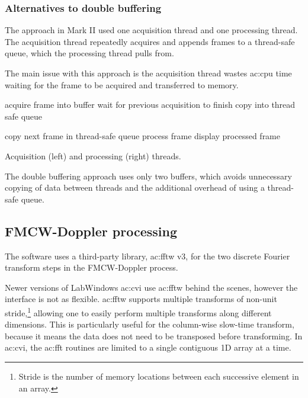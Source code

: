 \documentclass{article}
\begin{document}
\subsubsection{Alternatives to double buffering}\label{sc:AltToDblBuf}
The approach in Mark II used one acquisition thread and one processing thread. The acquisition thread repeatedly acquires and appends frames to a thread-safe queue, which the processing thread pulls from.

The main issue with this approach is the acquisition thread wastes \acrshort{ac:cpu} time waiting for the frame to be acquired and transferred to memory.

\begin{algorithm}
	\begin{minipage}{0.48\linewidth}
		\begin{algorithmic}
			\State acquire frame into buffer
			\State wait for previous acquisition to finish
			\State copy into thread safe queue
			\EndWhile
		\end{algorithmic}
	\end{minipage}
	\begin{minipage}{0.48\linewidth}
		\begin{algorithmic}
			\While {keep acquiring data}
			\State copy next frame in thread-safe queue
			\State process frame
			\State display processed frame
			\EndWhile
		\end{algorithmic}
	\end{minipage}
	\caption{Acquisition (left) and processing (right) threads.}\label{alg:TwoThreads}
\end{algorithm}

The double buffering approach uses only two buffers, which avoids unnecessary copying of data between threads and the additional overhead of using a thread-safe queue.

\subsection{FMCW-Doppler processing}
The software uses a third-party library, \acrshort{ac:fftw} v3\cite{FFTWv3}, for the two discrete Fourier transform steps in the FMCW-Doppler process.

Newer versions of LabWindows \acrshort{ac:cvi} use \acrshort{ac:fftw} behind the scenes, however the interface is not as flexible. \acrshort{ac:fftw} supports multiple transforms of non-unit stride,\footnote{Stride is the number of memory locations between each successive element in an array.} allowing one to easily perform multiple transforms along different dimensions. This is particularly useful for the column-wise slow-time transform, because it means the data does not need to be transposed before transforming. In \acrshort{ac:cvi}, the \acrshort{ac:fft} routines are limited to a single contiguous 1D array at a time. 
\end{document}
